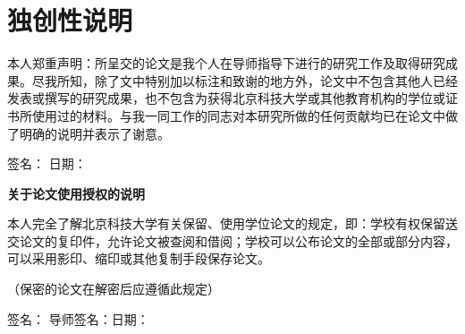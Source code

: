 
\chapter*{\centering \heiti {} \bf 独创性说明}
\doublespacing
本人郑重声明：所呈交的论文是我个人在导师指导下进行的研究工作及取得研究成果。尽我所知，除了文中特别加以标注和致谢的地方外，论文中不包含其他人已经发表或撰写的研究成果，也不包含为获得北京科技大学或其他教育机构的学位或证书所使用过的材料。与我一同工作的同志对本研究所做的任何贡献均已在论文中做了明确的说明并表示了谢意。\par

\vspace{3ex}

\begin{flushright}
签名：\underline{\makebox[3cm]{\qquad}} 日期：\underline{\makebox[3cm]{\qquad}}
\end{flushright}

\vspace{10ex}

\begin{center}
{ \bht \bf 关于论文使用授权的说明} 
\end{center}
\par

\vspace{5ex}

本人完全了解北京科技大学有关保留、使用学位论文的规定，即：学校有权保留送交论文的复印件，允许论文被查阅和借阅；学校可以公布论文的全部或部分内容，可以采用影印、缩印或其他复制手段保存论文。\par
（保密的论文在解密后应遵循此规定）\par

\vspace{3ex}

\begin{flushright}
签名：\underline{\makebox[3cm]{\qquad}} 导师签名：\underline{\makebox[3cm]{\qquad}}日期：\underline{\makebox[3cm]{\qquad}}
\end{flushright}
